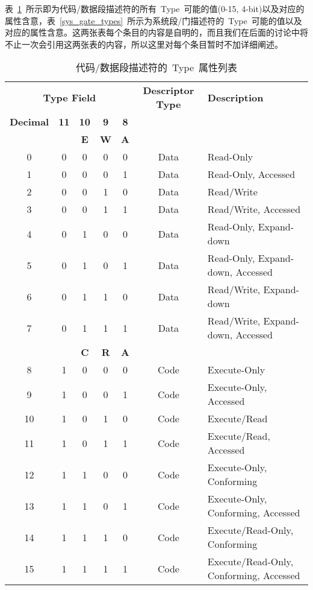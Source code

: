 \begin{itemize}
表~\ref{code_data_types}~所示即为代码/数据段描述符的所有~Type~可能的值(0-15, 4-bit)以及对应的属性含意，表~\ref{sys_gate_types}~所示为系统段/门描述符的~Type~可能的值以及对应的属性含意。这两张表每个条目的内容是自明的，而且我们在后面的讨论中将不止一次会引用这两张表的内容，所以这里对每个条目暂时不加详细阐述。

\begin{center}\begin{longtable}{c|c|c|c|c|c|l}
\caption[]{代码/数据段描述符的~Type~属性列表}\label{code_data_types}\\
\hline
\multicolumn{5}{c|}{\textbf{Type Field}} & \textbf{Descriptor Type} & \textbf{Description}\bigstrut\\
\cline{1-5}
\textbf{Decimal} & \textbf{11} & \textbf{10} & \textbf{9} & \textbf{8} & & \\
        &    &  \textbf{E} & \textbf{W} & \textbf{A} & & \\
\hline
0 & 0 & 0 & 0 & 0 & Data & Read-Only\\
1 & 0 & 0 & 0 & 1 & Data & Read-Only, Accessed\\
2 & 0 & 0 & 1 & 0 & Data & Read/Write\\
3 & 0 & 0 & 1 & 1 & Data & Read/Write, Accessed\\
4 & 0 & 1 & 0 & 0 & Data & Read-Only, Expand-down\\
5 & 0 & 1 & 0 & 1 & Data & Read-Only, Expand-down, Accessed\\
6 & 0 & 1 & 1 & 0 & Data & Read/Write, Expand-down\\
7 & 0 & 1 & 1 & 1 & Data & Read/Write, Expand-down, Accessed\\
\hline
        &    &  \textbf{C} & \textbf{R} & \textbf{A} & & \\
\hline
8 & 1 & 0 & 0 & 0 & Code & Execute-Only\\
9 & 1 & 0 & 0 & 1 & Code & Execute-Only, Accessed\\
10 & 1 & 0 & 1 & 0 & Code & Execute/Read\\
11 & 1 & 0 & 1 & 1 & Code & Execute/Read, Accessed\\
12 & 1 & 1 & 0 & 0 & Code & Execute-Only, Conforming\\
13 & 1 & 1 & 0 & 1 & Code & Execute-Only, Conforming, Accessed\\
14 & 1 & 1 & 1 & 0 & Code & Execute/Read-Only, Conforming\\
15 & 1 & 1 & 1 & 1 & Code & Execute/Read-Only, Conforming, Accessed\\
\hline
\end{longtable}\end{center}


\end{itemize}
